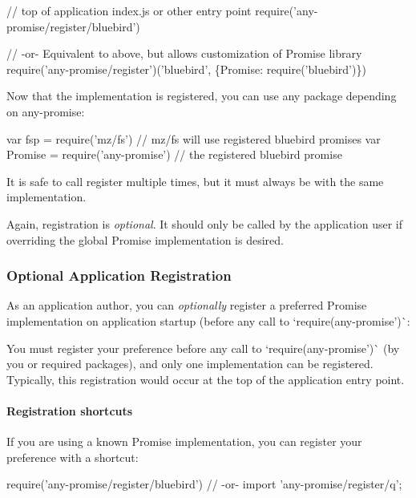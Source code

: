 \begin{DoxyCode}
// top of application index.js or other entry point
require('any-promise/register/bluebird')

// -or- Equivalent to above, but allows customization of Promise library
require('any-promise/register')('bluebird', \{Promise: require('bluebird')\})
\end{DoxyCode}


Now that the implementation is registered, you can use any package depending on {\ttfamily any-\/promise}\+:


\begin{DoxyCode}
var fsp = require('mz/fs') // mz/fs will use registered bluebird promises
var Promise = require('any-promise')  // the registered bluebird promise 
\end{DoxyCode}


It is safe to call {\ttfamily register} multiple times, but it must always be with the same implementation.

Again, registration is {\itshape optional}. It should only be called by the application user if overriding the global {\ttfamily Promise} implementation is desired.

\subsubsection*{Optional Application Registration}

As an application author, you can {\itshape optionally} register a preferred {\ttfamily Promise} implementation on application startup (before any call to `require(\textquotesingle{}any-\/promise')\`{}\+:

You must register your preference before any call to `require(\textquotesingle{}any-\/promise')\`{} (by you or required packages), and only one implementation can be registered. Typically, this registration would occur at the top of the application entry point.

\paragraph*{Registration shortcuts}

If you are using a known {\ttfamily Promise} implementation, you can register your preference with a shortcut\+:


\begin{DoxyCode}
require('any-promise/register/bluebird')
// -or-
import 'any-promise/register/q';
\end{DoxyCode}


